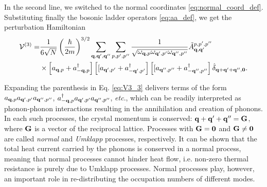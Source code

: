 In the second line, we switched to the normal coordinates \eqref{eq:normal_coord_def}. Substituting finally the bosonic ladder operators \eqref{eq:aa_def}, we get the perturbation Hamiltonian
\begin{alignat}{2}
\mathcal{V}^{(3)} = & \frac{1}{6\sqrt{N}} \left(\frac{\hbar}{2m} \right)^{3/2} \sum_{\mathbf{q},\mathbf{q}',\mathbf{q}''} \sum_{p,p',p''} \frac{1}{\sqrt{\omega_{\mathbf{q},p}\omega_{\mathbf{q}',p'} \omega_{\mathbf{q}'',p''}}} \tilde{A}^{p,p',p''}_{\mathbf{q},\mathbf{q}'} \notag \\
  & \times \left[a_{\mathbf{q},p}+a_{-\mathbf{q},p}^{\dagger} \right] \left[[a_{\mathbf{q}',p'}+a_{-\mathbf{q}',p'}^{\dagger}\right] \left[[a_{\mathbf{q}'',p''}+a_{-\mathbf{q}'',p''}^{\dagger}\right] \hat \delta_{\mathbf{q}+\mathbf{q}'+\mathbf{q}'',\mathbf{0}}. \label{eq:V3_3}
\end{alignat}

Expanding the parenthesis in Eq. \eqref{eq:V3_3} delivers terms of the form $a_{\mathbf{q},p}a_{\mathbf{q}',p'}a_{\mathbf{q}'',p''}$, $a_{-\mathbf{q},p}^{\dagger} a_{\mathbf{q}',p'}a_{\mathbf{q}'',p''}$, \textit{etc}., which can be readily interpreted as phonon-phonon interactions resulting in the annihilation and creation of phonons. In each such processes, the crystal momentum is conserved: $\mathbf{q}+\mathbf{q}'+\mathbf{q}''=\mathbf{G}$, where $\mathbf{G}$ is a vector of the reciprocal lattice. Processes with $\mathbf{G}=\mathbf{0}$ and $\mathbf{G}\neq \mathbf{0}$ are called \textit{normal} and \textit{Umklapp} processes, respectively. It can be shown \cite{ziman} that the total heat current carried by the phonons is conserved in a normal process, meaning that normal processes cannot hinder heat flow, i.e. non-zero thermal resistance is purely due to Umklapp processes. Normal processes play, however, an important role in re-distributing the occupation numbers of different modes.

\iffalse 
\chapter{MD methods for thermal conductivity prediction}

\begin{itemize}
 \item M\"uller-Plathe \cite{mullerplathe97}: exchange the velocities of hot and cold atoms (\textit{fix thermal/conductivity} in LAMMPS), use PBC
 \item Jund-Jullien \cite{jund99}: scale the velocities of hot and cold regions such that total momentum conserved (\textit{fix heat} in LAMMPS), use PBC. Used also e.g. by Schelling
 \item Ikeshoji-Hafskjold \cite{ikeshoji94}: Apparently the same kind of scaling as was used by Jund and Jullien later, but applied here for liquids and gases
 \item Landry \cite{landry08}: Jund-Jullien method without PBC, fixed boundary atoms
 \item Different methods reviewed by Schelling
\end{itemize}
\fi
